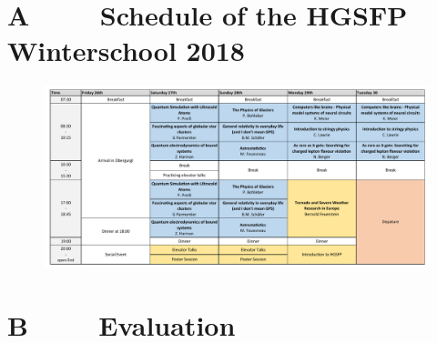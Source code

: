 \newpage
\section*{A $\qquad$ Schedule of the HGSFP Winterschool 2018}

\begin{figure}[h!]
\centering
\includegraphics[scale=0.71, angle = 90 ]{figures/Program.pdf}
\end{figure}


\section*{B $\qquad$ Evaluation}

